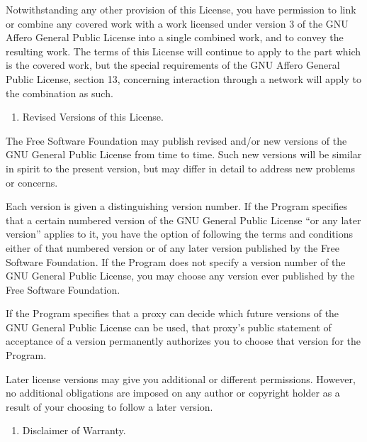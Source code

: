 \documentclass[letterpaper,10pt,english]{sphinxmanual}
\begin{document}
Notwithstanding any other provision of this License, you have
permission to link or combine any covered work with a work licensed
under version 3 of the GNU Affero General Public License into a single
combined work, and to convey the resulting work.  The terms of this
License will continue to apply to the part which is the covered work,
but the special requirements of the GNU Affero General Public License,
section 13, concerning interaction through a network will apply to the
combination as such.
\begin{enumerate}
%
\setcounter{enumi}{13}
\item {} 
Revised Versions of this License.

\end{enumerate}

The Free Software Foundation may publish revised and/or new versions of
the GNU General Public License from time to time.  Such new versions will
be similar in spirit to the present version, but may differ in detail to
address new problems or concerns.

Each version is given a distinguishing version number.  If the
Program specifies that a certain numbered version of the GNU General
Public License “or any later version” applies to it, you have the
option of following the terms and conditions either of that numbered
version or of any later version published by the Free Software
Foundation.  If the Program does not specify a version number of the
GNU General Public License, you may choose any version ever published
by the Free Software Foundation.

If the Program specifies that a proxy can decide which future
versions of the GNU General Public License can be used, that proxy’s
public statement of acceptance of a version permanently authorizes you
to choose that version for the Program.

Later license versions may give you additional or different
permissions.  However, no additional obligations are imposed on any
author or copyright holder as a result of your choosing to follow a
later version.
\begin{enumerate}
%
\setcounter{enumi}{14}
\item {} 
Disclaimer of Warranty.

\end{enumerate}
\end{document}
